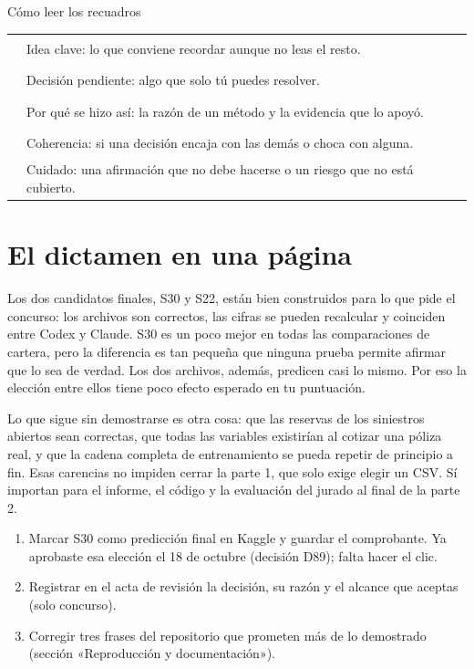 \documentclass[11pt,a4paper]{article}
\begin{document}
\begin{titlepage}
\vspace{0.3cm}
{\sffamily\small\color{gris} Cómo leer los recuadros}\par
\vspace{2pt}
\begin{tabularx}{\linewidth}{@{}P{0.6cm}L@{}}
\textcolor{azul}{\rule{0.4cm}{0.4cm}} & Idea clave: lo que conviene recordar aunque no leas el resto. \\
\textcolor{ambar}{\rule{0.4cm}{0.4cm}} & Decisión pendiente: algo que solo tú puedes resolver. \\
\textcolor{verde}{\rule{0.4cm}{0.4cm}} & Por qué se hizo así: la razón de un método y la evidencia que lo apoyó. \\
\textcolor{violeta}{\rule{0.4cm}{0.4cm}} & Coherencia: si una decisión encaja con las demás o choca con alguna. \\
\textcolor{rojo}{\rule{0.4cm}{0.4cm}} & Cuidado: una afirmación que no debe hacerse o un riesgo que no está cubierto. \\
\end{tabularx}
\end{titlepage}

{\setlength{\parskip}{0pt}\small\tableofcontents}
\newpage

\section{El dictamen en una página}

Los dos candidatos finales, S30 y S22, están bien construidos para lo que pide el concurso: los archivos son correctos, las cifras se pueden recalcular y coinciden entre Codex y Claude. S30 es un poco mejor en todas las comparaciones de cartera, pero la diferencia es tan pequeña que ninguna prueba permite afirmar que lo sea de verdad. Los dos archivos, además, predicen casi lo mismo. Por eso la elección entre ellos tiene poco efecto esperado en tu puntuación.

Lo que sigue sin demostrarse es otra cosa: que las reservas de los siniestros abiertos sean correctas, que todas las variables existirían al cotizar una póliza real, y que la cadena completa de entrenamiento se pueda repetir de principio a fin. Esas carencias no impiden cerrar la parte 1, que solo exige elegir un CSV. Sí importan para el informe, el código y la evaluación del jurado al final de la parte 2.

\begin{clave}
\begin{enumerate}
\item Marcar S30 como predicción final en Kaggle y guardar el comprobante. Ya aprobaste esa elección el 18 de octubre (decisión D89); falta hacer el clic.
\item Registrar en el acta de revisión la decisión, su razón y el alcance que aceptas (solo concurso).
\item Corregir tres frases del repositorio que prometen más de lo demostrado (sección «Reproducción y documentación»).
\end{enumerate}
\end{clave}
\end{document}
